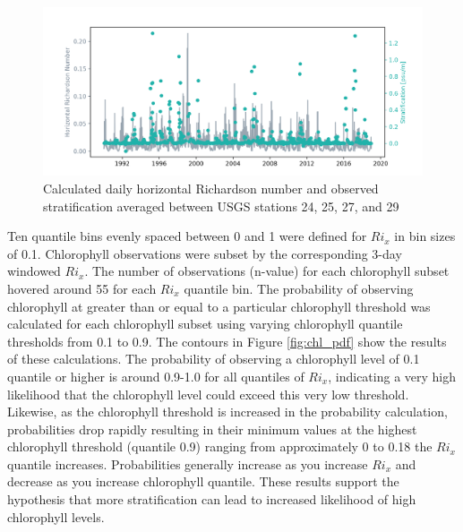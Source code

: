 \documentclass[preprint,review,12pt]{elsarticle}
\begin{document}
\begin{figure}[ht!]
\centering
\includegraphics[width=\textwidth]{Figures/Rix_dsdz_timeseries.png}
\caption{Calculated daily horizontal Richardson number and observed stratification averaged between USGS stations 24, 25, 27, and 29}
\label{fig:rix}
\end{figure}
\FloatBarrier

Ten quantile bins evenly spaced between 0 and 1 were defined for \(Ri_x\) in bin sizes of 0.1. Chlorophyll observations were subset by the corresponding 3-day windowed \(Ri_x\). The number of observations (n-value) for each chlorophyll subset hovered around 55 for each \(Ri_x\) quantile bin. The probability of observing chlorophyll at greater than or equal to a particular chlorophyll threshold was calculated for each chlorophyll subset using varying chlorophyll quantile thresholds from 0.1 to 0.9. The contours in Figure \ref{fig:chl_pdf} show the results of these calculations. The probability of observing a chlorophyll level of 0.1 quantile or higher is around 0.9-1.0 for all quantiles of \(Ri_x\), indicating a very high likelihood that the chlorophyll level could exceed this very low threshold. Likewise, as the chlorophyll threshold is increased in the probability calculation, probabilities drop rapidly resulting in their minimum values at the highest chlorophyll threshold (quantile 0.9) ranging from approximately 0 to 0.18 the \(Ri_x\) quantile increases. Probabilities generally increase as you increase \(Ri_x\) and decrease as you increase chlorophyll quantile. These results support the hypothesis that more stratification can lead to increased likelihood of high chlorophyll levels.
\end{document}

